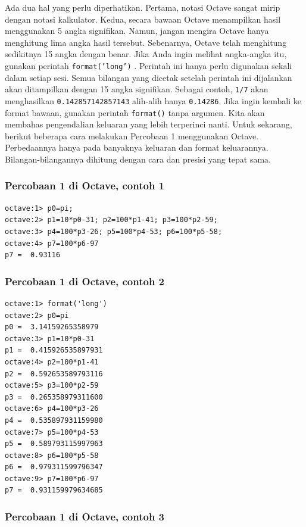 Ada dua hal yang perlu diperhatikan. Pertama, notasi Octave sangat
mirip dengan notasi kalkulator. Kedua, secara bawaan Octave menampilkan
hasil menggunakan 5 angka signifikan. Namun, jangan mengira Octave
hanya menghitung lima angka hasil tersebut. Sebenarnya, Octave telah
menghitung sedikitnya 15 angka dengan benar. Jika Anda ingin melihat
angka-angka itu, gunakan perintah \texttt{format('long')} .
Perintah ini hanya perlu digunakan sekali dalam setiap sesi. Semua
bilangan yang dicetak setelah perintah ini dijalankan akan ditampilkan
dengan 15 angka signifikan. Sebagai contoh, \texttt{1/7} akan menghasilkan
\texttt{0.142857142857143} alih-alih hanya \texttt{0.14286}. Jika
ingin kembali ke format bawaan, gunakan perintah \texttt{format()}
tanpa argumen. Kita akan membahas pengendalian keluaran yang lebih
terperinci nanti. Untuk sekarang, berikut beberapa cara melakukan
Percobaan 1 menggunakan Octave. Perbedaannya hanya pada banyaknya
keluaran dan format keluarannya. Bilangan-bilangannya dihitung dengan
cara dan presisi yang tepat sama.

\subsubsection{Percobaan 1 di Octave, contoh 1}

\begin{verbatim}
octave:1> p0=pi;
octave:2> p1=10*p0-31; p2=100*p1-41; p3=100*p2-59;
octave:3> p4=100*p3-26; p5=100*p4-53; p6=100*p5-58;
octave:4> p7=100*p6-97
p7 =  0.93116 
\end{verbatim}

\subsubsection{Percobaan 1 di Octave, contoh 2}

\begin{verbatim}
octave:1> format('long')
octave:2> p0=pi
p0 =  3.14159265358979
octave:3> p1=10*p0-31
p1 =  0.415926535897931
octave:4> p2=100*p1-41
p2 =  0.592653589793116
octave:5> p3=100*p2-59
p3 =  0.265358979311600
octave:6> p4=100*p3-26
p4 =  0.535897931159980
octave:7> p5=100*p4-53
p5 =  0.589793115997963
octave:8> p6=100*p5-58
p6 =  0.979311599796347
octave:9> p7=100*p6-97
p7 =  0.931159979634685 
\end{verbatim}

\subsubsection{Percobaan 1 di Octave, contoh 3}

